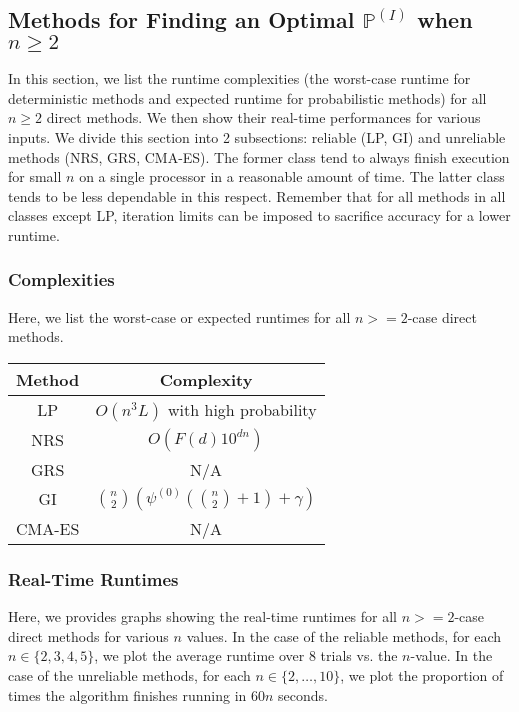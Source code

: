 \documentclass{article}
\begin{document}
\subsection{Methods for Finding an Optimal $\mathbb{P}^{(I)}$ when $n \geq 2$}
In this section, we list the runtime complexities (the worst-case runtime for deterministic methods and expected runtime for probabilistic methods) for all $n \geq 2$ direct methods. We then show their real-time performances for various inputs. We divide this section into 2 subsections: reliable (LP, GI) and unreliable methods (NRS, GRS, CMA-ES). The former class tend to always finish execution for small $n$ on a single processor in a reasonable amount of time. The latter class tends to be less dependable in this respect. Remember that for all methods in all classes except LP, iteration limits can be imposed to sacrifice accuracy for a lower runtime.


\subsubsection{Complexities}
Here, we list the worst-case or expected runtimes for all $n >= 2$-case direct methods.

\begin{center}
\begin{tabular}{c|c}
    Method & Complexity \\
    \hline
    LP & $O(n^3L)$ with high probability \cite{simplex} \cite{simplexTime} \cite{simplexRand} \\
    NRS & $O(F(d)10^{dn})$ \\
    GRS & N/A \\
    GI \cite{wolfGI} & ${n \choose 2}(\psi^{(0)}({n \choose 2} + 1) + \gamma)$ \\
    CMA-ES & N/A
\end{tabular}
\end{center}

\subsubsection{Real-Time Runtimes}
Here, we provides graphs showing the real-time runtimes for all $n >= 2$-case direct methods for various $n$ values. In the case of the reliable methods, for each $n \in \{2, 3, 4, 5\}$, we plot the average runtime over 8 trials vs. the $n$-value. In the case of the unreliable methods, for each $n \in \{2,\dots, 10\}$, we plot the proportion of times the algorithm finishes running in $60n$ seconds.
\end{document}

